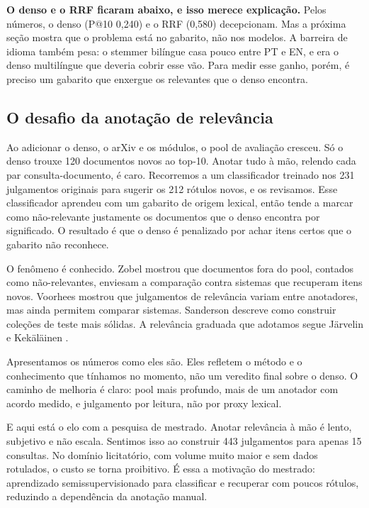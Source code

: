 \documentclass[12pt]{article}
\begin{document}
\textbf{O denso e o RRF ficaram abaixo, e isso merece explicação.} Pelos números, o denso (P@10 0,240) e o RRF (0,580) decepcionam. Mas a próxima seção mostra que o problema está no gabarito, não nos modelos. A barreira de idioma também pesa: o stemmer bilíngue casa pouco entre PT e EN, e era o denso multilíngue que deveria cobrir esse vão. Para medir esse ganho, porém, é preciso um gabarito que enxergue os relevantes que o denso encontra.

\subsection{O desafio da anotação de relevância}
\label{sec:anotacao}

Ao adicionar o denso, o arXiv e os módulos, o pool de avaliação cresceu. Só o denso trouxe 120 documentos novos ao top-10. Anotar tudo à mão, relendo cada par consulta-documento, é caro. Recorremos a um classificador treinado nos 231 julgamentos originais para sugerir os 212 rótulos novos, e os revisamos. Esse classificador aprendeu com um gabarito de origem lexical, então tende a marcar como não-relevante justamente os documentos que o denso encontra por significado. O resultado é que o denso é penalizado por achar itens certos que o gabarito não reconhece.

O fenômeno é conhecido. Zobel \cite{zobel1998} mostrou que documentos fora do pool, contados como não-relevantes, enviesam a comparação contra sistemas que recuperam itens novos. Voorhees \cite{voorhees2000} mostrou que julgamentos de relevância variam entre anotadores, mas ainda permitem comparar sistemas. Sanderson \cite{sanderson2010} descreve como construir coleções de teste mais sólidas. A relevância graduada que adotamos segue Järvelin e Kekäläinen \cite{jarvelin2002}.

Apresentamos os números como eles são. Eles refletem o método e o conhecimento que tínhamos no momento, não um veredito final sobre o denso. O caminho de melhoria é claro: pool mais profundo, mais de um anotador com acordo medido, e julgamento por leitura, não por proxy lexical.

E aqui está o elo com a pesquisa de mestrado. Anotar relevância à mão é lento, subjetivo e não escala. Sentimos isso ao construir 443 julgamentos para apenas 15 consultas. No domínio licitatório, com volume muito maior e sem dados rotulados, o custo se torna proibitivo. É essa a motivação do mestrado: aprendizado semissupervisionado para classificar e recuperar com poucos rótulos, reduzindo a dependência da anotação manual.
\end{document}
